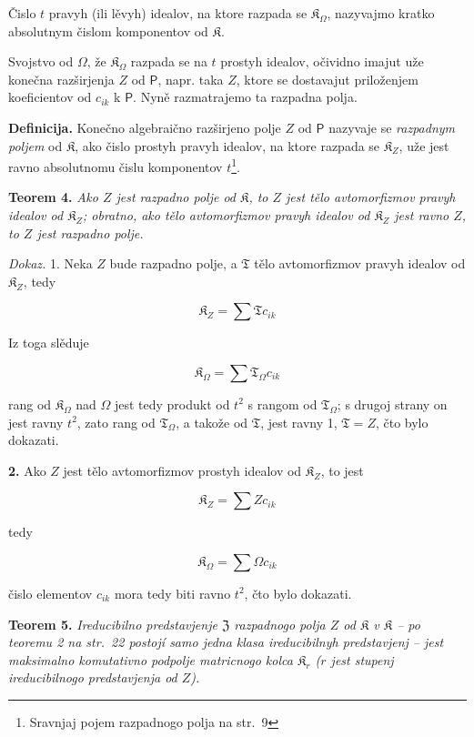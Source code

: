 \documentclass[11pt]{article}
\newcommand{\srcfn}[2]{\footnote{#2}}
\begin{document}
Čislo \(t\) pravyh (ili lěvyh) idealov, na ktore razpada se \(\mathfrak K_\Omega\), nazyvajmo kratko absolutnym čislom komponentov od \(\mathfrak K\).

Svojstvo od \(\Omega\), že \(\mathfrak K_\Omega\) razpada se na \(t\) prostyh idealov, očividno imajut uže konečna razširjenja \(Z\) od \(\mathsf P\), napr. taka \(Z\), ktore se dostavajut priloženjem koeficientov od \(c_{ik}\) k \(\mathsf P\). Nyně razmatrajemo ta razpadna polja.

\textbf{Definicija.} Konečno algebraično razširjeno polje \(Z\) od \(\mathsf P\) nazyvaje se \emph{razpadnym poljem} od \(\mathfrak K\), ako čislo prostyh pravyh idealov, na ktore razpada se \(\mathfrak K_Z\), uže jest ravno absolutnomu čislu komponentov \(t\)\srcfn{1}{Sravnjaj pojem razpadnogo polja na str.~9}.

\textbf{Teorem 4.} \emph{Ako \(Z\) jest razpadno polje od \(\mathfrak K\), to \(Z\) jest tělo avtomorfizmov pravyh idealov od \(\mathfrak K_Z\); obratno, ako tělo avtomorfizmov pravyh idealov od \(\mathfrak K_Z\) jest ravno \(Z\), to \(Z\) jest razpadno polje.}

\emph{Dokaz.} 1. Neka \(Z\) bude razpadno polje, a \(\mathfrak T\) tělo avtomorfizmov pravyh idealov od \(\mathfrak K_Z\), tedy

\[
\mathfrak K_Z=\sum\mathfrak T c_{ik}
\]

Iz toga slěduje

\[
\mathfrak K_\Omega=\sum\mathfrak T_\Omega c_{ik}
\]

rang od \(\mathfrak K_\Omega\) nad \(\Omega\) jest tedy produkt od \(t^2\) s rangom od \(\mathfrak T_\Omega\); s drugoj strany on jest ravny \(t^2\), zato rang od \(\mathfrak T_\Omega\), a takože od \(\mathfrak T\), jest ravny 1, \(\mathfrak T=Z\), čto bylo dokazati.

\textbf{2.} Ako \(Z\) jest tělo avtomorfizmov prostyh idealov od \(\mathfrak K_Z\), to jest

\[
\mathfrak K_Z=\sum Zc_{ik}
\]

tedy

\[
\mathfrak K_\Omega=\sum\Omega c_{ik}
\]

čislo elementov \(c_{ik}\) mora tedy biti ravno \(t^2\), čto bylo dokazati.

\textbf{Teorem 5.} \emph{Ireducibilno predstavjenje \(\mathfrak Z\) razpadnogo polja \(Z\) od \(\mathfrak K\) v \(\mathfrak K\) -- po teoremu 2 na str.~22 postojí samo jedna klasa ireducibilnyh predstavjenj -- jest maksimalno komutativno podpolje matricnogo kolca \(\mathfrak K_r\) (\(r\) jest stupenj ireducibilnogo predstavjenja od \(Z\)).}
\end{document}
